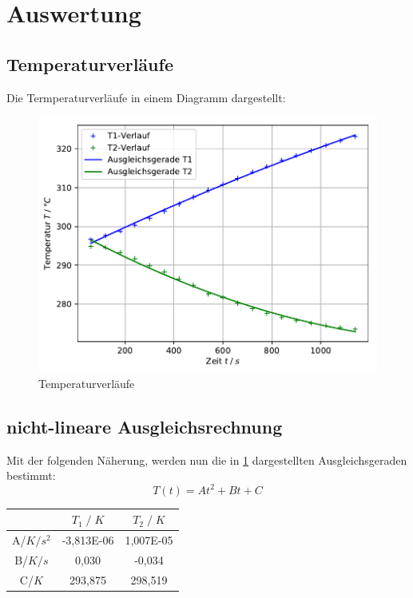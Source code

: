 \newpage
\section{Auswertung}
\label{sec:Auswertung}

\subsection{Temperaturverläufe}
    Die Termperaturverläufe in einem Diagramm dargestellt:
    \begin{figure}
        \centering
        \includegraphics[width=\textwidth]{build/plot_temp.pdf}
        \caption{Temperaturverläufe}
        \label{fig:plot_temp}
\end{figure}

\subsection{nicht-lineare Ausgleichsrechnung}
    Mit der folgenden Näherung, werden nun die in \ref{fig:plot_temp}
    dargestellten Ausgleichsgeraden bestimmt\cite{curvefit}:
    \begin{equation}
        T(t)=At^2+Bt+C
        \label{eqn:ausgleichsgerade}
    \end{equation}
    \begin{table}
        \centering
        \begin{tabular}{c || c | c}
            \toprule
            & $T_1\;/\;K$ & $T_2\;/\;K$ \\
            \midrule
            A\;/\;$K/s^2$& -3,813E-06 & 1,007E-05 \\
            B\;/\;$K/s$& 0,030 & -0,034 \\
            C\;/\;$K$& 293,875 & 298,519 \\
            \bottomrule
        \end{tabular}
    \end{table}
